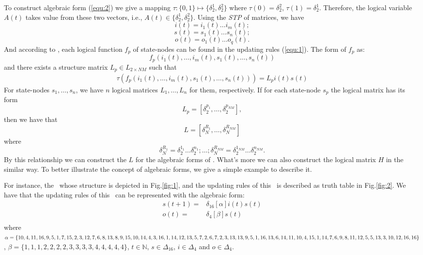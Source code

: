To construct algebraic form (\ref{equ:2}) we give a mapping $\tau:\{0,1\}\mapsto \{\delta_2^1, \delta_2^2\}$ where $\tau(0)=\delta_2^2$, $\tau(1)= \delta_2^1$. 
Therefore, the logical variable $A(t)$ takes value from these two vectors, i.e., $A(t)\in \{\delta_2^1, \delta_2^2\}$. Using the {\em STP} of matrices, we have 
\[i(t)=i_1(t){\ldots}i_m(t);\] 
\[s(t)=s_1(t){\ldots}s_n(t);\] 
\[o(t)=o_1(t){\ldots}o_q(t).\] 
And according to \cite{Cheng2003Semi}, each logical function $f_p$ of state-nodes can be found in the updating rules (\ref{equ:1}). The form of  $f_p$ as:
\[f_p(i_1(t),\ldots,i_m(t),s_1(t),\ldots,s_n(t))\] 
and there exists a structure matrix $L_p\in L_{2\times {NM}}$ such that
\begin{equation}
\begin{split}
\tau(f_p(i_1(t),\ldots,i_m(t),s_1(t),\ldots,s_n(t)))= L_pi(t)s(t)
\end{split}
\end{equation}
For state-nodes $s_1,\ldots,s_n$, we have $n$ logical matrices $L_1,\ldots,L_n$ for them, respectively. 
If for each state-node $s_p$ the logical matrix has its form
\[L_p=[\delta_2^{p_1},\ldots,\delta_2^{p_{NM}}],\] 
then we have that %
\[L=[\delta_N^{R_1},\ldots,\delta_N^{R_{NM}}]\]  where 
\[\delta_N^{R_1}=\delta_2^{1_1}\ldots\delta_2^{n_1};\ldots; \delta_N^{R_{NM}}=\delta_2^{1_{NM}}\ldots\delta_2^{n_{NM}}.\] 
By this relationship we can construct the $L$ for the algebraic forms of \BCNs. What's more we can also construct the logical matrix $H$ in the similar way. To better illustrate the concept of algebraic forms, we give a simple example to describe it.
\begin{example}
For instance, the \BCN\ whose structure is depicted in Fig.\ref{fig:1}, and the updating rules of this \BCN\ is described as truth table in Fig.\ref{fig:2}. We have that the updating rules of this \BCN\ can be represented with the algebraic form:
\begin{equation}
\begin{split}
s(t+1) =&\delta_{16}[\alpha]i(t)s(t)\\
o(t) =&\delta_4[\beta]s(t)\\
\end{split}
\label{equ:4}
\end{equation}
where $\alpha=\{10,4,11,16,9,5,1, 7,15,2,3,12,7,6,8,13,8,9,\\15,10,14,4,3,16,1,14,12,13,5,7,2,6,7,2,3,13,13,9,5,1,\\16,13 ,6,14,11,10,4,15,1,14 ,7,6,9 ,8,11,12,5,5,13,3,10,\\12,16,16\}$, $\beta=\{1,1,1,2,2,2,2,3,3,3,3,4,4,4,4,4\}$, $t\in \mathbb{N}$, $s\in \Delta_{16}$, $i\in \Delta_4$ and $o\in \Delta_4$.
\end{example}   
